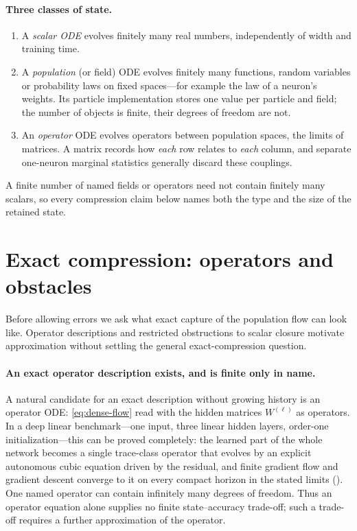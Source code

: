 \documentclass[11pt]{article}
\theoremstyle{definition}
\theoremstyle{remark}
\begin{document}
\paragraph{Three classes of state.}
\begin{enumerate}
\item A \emph{scalar ODE} evolves finitely many real numbers, independently of
width and training time.
\item A \emph{population} (or field) ODE evolves finitely many functions, random
variables or probability laws on fixed spaces---for example the law of a neuron's
weights.  Its particle implementation stores one value per particle and field;
the number of objects is finite, their degrees of freedom are not.
\item An \emph{operator} ODE evolves operators between population spaces, the
limits of matrices.  A matrix records how \emph{each} row relates to \emph{each}
column, and separate one-neuron marginal statistics generally discard these
couplings.
\end{enumerate}
A finite number of named fields or operators need not contain finitely many
scalars, so every compression claim below names both the type and the size of
the retained state.

\section{Exact compression: operators and obstacles}
\label{sec:exact}

Before allowing errors we ask what exact capture of the population flow can look
like.  Operator descriptions and restricted obstructions to scalar closure
motivate approximation without settling the general exact-compression question.

\paragraph{An exact operator description exists, and is finite only in name.}
A natural candidate for an exact description without growing history is an
operator ODE: \eqref{eq:dense-flow}
read with the hidden matrices $W^{(\ell)}$ as operators.  In a deep linear
benchmark---one input, three linear hidden layers, order-one initialization---this
can be proved completely: the learned part of the whole network becomes a single
trace-class operator that evolves by an explicit autonomous cubic equation
driven by the residual, and finite gradient flow and gradient descent converge
to it on every compact horizon in the stated limits ().
One named operator can contain infinitely many degrees of freedom.  Thus an
operator equation alone supplies no finite state--accuracy trade-off; such a
trade-off requires a further approximation of the operator.
\end{document}
